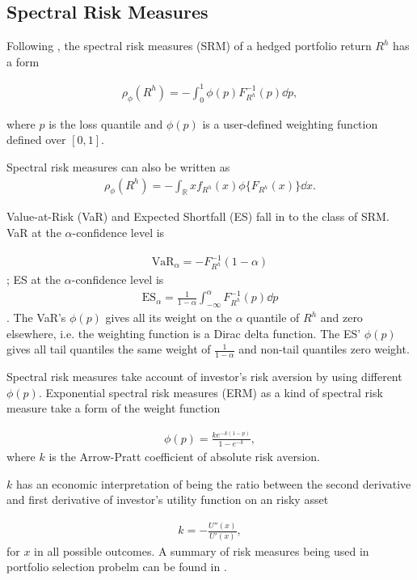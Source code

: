 \subsection{Spectral Risk Measures}\label{subsec:spectral-risk-measures}
Following \citet{dowd2008spectral}, the spectral risk measures (SRM) of a hedged portfolio return $R^h$ has a form

\begin{align}
	\rho_\phi(R^h) = - \int_0^1 \phi(p) F_{R^h}^{-1}(p)\dd p,
	\end{align}

where $p$ is the loss quantile and $\phi(p)$ is a user-defined weighting function defined over $[0,1]$. \medskip

Spectral risk measures can also be written as
\begin{align}
	\rho_\phi(R^h) = - \int_\mathbb{R} x f_{R^h}(x) \phi\{F_{R^h}(x)\} \dd x.
	\end{align}

Value-at-Risk (VaR) and Expected Shortfall (ES) fall in to the class of SRM.
VaR at the $\alpha$-confidence level is

\begin{align}
	\text{VaR}_\alpha = - F_{R^h}^{-1}(1-\alpha)
	\end{align};
ES at the $\alpha$-confidence level is
\begin{align}
	\text{ES}_\alpha = \frac{1}{1-\alpha}\int_{-\infty}^{\alpha} F_{R^h}^{-1}(p) \dd p
	\end{align}.
The VaR's $\phi(p)$ gives all its weight on the $\alpha$ quantile of $R^h$ and zero elsewhere, i.e. the weighting function is a Dirac delta function.
The ES' $\phi(p)$ gives all tail quantiles the same weight of $\frac{1}{1-\alpha}$ and non-tail quantiles zero weight. \medskip

Spectral risk measures take account of investor's risk aversion by using different $\phi(p)$.
Exponential spectral risk measures (ERM) as a kind of spectral risk measure take a form of the weight function

\begin{align}
	\phi(p) =\frac{k e^{-k(1-p)}}{1-e^{-k}} ,
	\end{align}
where $k$ is the Arrow-Pratt coefficient of absolute risk aversion. \medskip

$k$ has an economic interpretation of being the ratio between the second derivative and first derivative
of investor's utility function on an risky asset

\begin{align}
	k = -\frac{U''(x)}{U'(x)},
	\end{align}
for $x$ in all possible outcomes.
A summary of risk measures being used in portfolio selection probelm can be found in \citet{hardle2008applied}.\medskip

